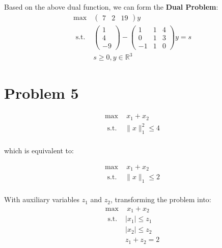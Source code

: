 \documentclass[12pt]{article}
\begin{document}
Based on the above dual function, we can form the \textbf{Dual Problem}:
$$
\begin{array}{cc}
\max & \left( \begin{array}{ccc} 7 & 2 & 19 \end{array} \right) y \\
\text { s.t. } & \left( \begin{array}{c} 1 \\ 4 \\ -9 \end{array} \right) - \left(\begin{array}{rrr}
1 & 1 & 4 \\
0 & 1 & 3 \\
-1 & 1 & 0
\end{array}\right) y = s \\
& s \geq 0,y \in \mathbb{R}^3
\end{array}
$$
    
\clearpage
\section{Problem 5}
\[
\begin{array}{cc}
 \max & \ x_1 + x_2 \\
\text { s.t. } &  \|x\|_1^2 \leq 4 \\
\end{array}
\]

which is equivalent to:

\[
\begin{array}{cc}
 \max & \ x_1 + x_2 \\
\text { s.t. } &  \|x\|_1 \leq 2 \\
\end{array}
\]

With auxiliary variables \(z_1\) and \(z_2\), transforming the problem into:
\[
\begin{array}{cc}
 \max & \ x_1 + x_2 \\
\text { s.t. } & |x_1| \leq z_1\\
& |x_2| \leq z_2\\
& z_1 + z_2 = 2\\
\end{array}
\]

\clearpage
\end{document}
